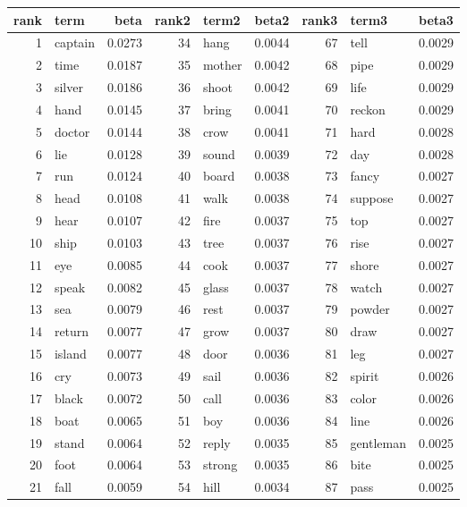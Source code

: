 \begin{table}[ht]
\centering
\begin{tabular}{rlrrlrrlr}
  \hline
rank & term & beta & rank2 & term2 & beta2 & rank3 & term3 & beta3 \\ 
  \hline
1 & captain & 0.0273 & 34 & hang & 0.0044 & 67 & tell & 0.0029 \\ 
  2 & time & 0.0187 & 35 & mother & 0.0042 & 68 & pipe & 0.0029 \\ 
  3 & silver & 0.0186 & 36 & shoot & 0.0042 & 69 & life & 0.0029 \\ 
  4 & hand & 0.0145 & 37 & bring & 0.0041 & 70 & reckon & 0.0029 \\ 
  5 & doctor & 0.0144 & 38 & crow & 0.0041 & 71 & hard & 0.0028 \\ 
  6 & lie & 0.0128 & 39 & sound & 0.0039 & 72 & day & 0.0028 \\ 
  7 & run & 0.0124 & 40 & board & 0.0038 & 73 & fancy & 0.0027 \\ 
  8 & head & 0.0108 & 41 & walk & 0.0038 & 74 & suppose & 0.0027 \\ 
  9 & hear & 0.0107 & 42 & fire & 0.0037 & 75 & top & 0.0027 \\ 
  10 & ship & 0.0103 & 43 & tree & 0.0037 & 76 & rise & 0.0027 \\ 
  11 & eye & 0.0085 & 44 & cook & 0.0037 & 77 & shore & 0.0027 \\ 
  12 & speak & 0.0082 & 45 & glass & 0.0037 & 78 & watch & 0.0027 \\ 
  13 & sea & 0.0079 & 46 & rest & 0.0037 & 79 & powder & 0.0027 \\ 
  14 & return & 0.0077 & 47 & grow & 0.0037 & 80 & draw & 0.0027 \\ 
  15 & island & 0.0077 & 48 & door & 0.0036 & 81 & leg & 0.0027 \\ 
  16 & cry & 0.0073 & 49 & sail & 0.0036 & 82 & spirit & 0.0026 \\ 
  17 & black & 0.0072 & 50 & call & 0.0036 & 83 & color & 0.0026 \\ 
  18 & boat & 0.0065 & 51 & boy & 0.0036 & 84 & line & 0.0026 \\ 
  19 & stand & 0.0064 & 52 & reply & 0.0035 & 85 & gentleman & 0.0025 \\ 
  20 & foot & 0.0064 & 53 & strong & 0.0035 & 86 & bite & 0.0025 \\ 
  21 & fall & 0.0059 & 54 & hill & 0.0034 & 87 & pass & 0.0025 \\ 

\end{tabular}
\end{table}
